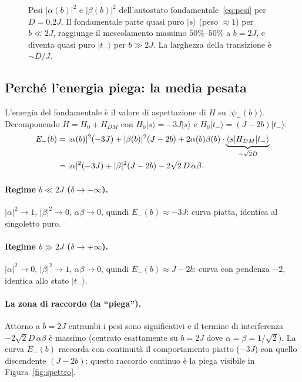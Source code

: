 \documentclass[11pt,a4paper]{article}
\newcommand{\ket}[1]{\lvert #1 \rangle}
\newcommand{\melem}[3]{\langle #1 \vert #2 \vert #3 \rangle}
\theoremstyle{definition}
\begin{document}
\begin{figure}[htbp]
\caption{Pesi $|\alpha(b)|^2$ e $|\beta(b)|^2$ dell'autostato fondamentale~\eqref{eq:pesi}
per $D=0.2J$. Il fondamentale parte quasi puro $\ket{s}$ (peso $\approx1$) per $b\ll2J$,
raggiunge il mescolamento massimo $50\%$--$50\%$ a $b=2J$, e diventa quasi puro $\ket{t_-}$
per $b\gg2J$. La larghezza della transizione è $\sim D/J$.}
\label{fig:mixing}
\end{figure}

\FloatBarrier
\subsection{Perché l'energia piega: la media pesata}

L'energia del fondamentale è il valore di aspettazione di $H$ su $\ket{\psi_-(b)}$.
Decomponendo $H=H_0+H_{DM}$ con $H_0\ket{s}=-3J\ket{s}$ e $H_0\ket{t_-}=(J-2b)\ket{t_-}$:
\begin{align}
E_-(b)
&=|\alpha(b)|^2(-3J)+|\beta(b)|^2(J-2b)
+2\alpha(b)\beta(b)\cdot\underbrace{\melem{s}{H_{DM}}{t_-}}_{-\sqrt2 D}\notag\\
&=|\alpha|^2(-3J)+|\beta|^2(J-2b)-2\sqrt2\,D\,\alpha\beta.
\label{eq:Emedia}
\end{align}

\paragraph{Regime $b\ll2J$ ($\delta\to-\infty$).}
$|\alpha|^2\to1$, $|\beta|^2\to0$, $\alpha\beta\to0$, quindi
$E_-(b)\approx-3J$: curva piatta, identica al singoletto puro.

\paragraph{Regime $b\gg2J$ ($\delta\to+\infty$).}
$|\alpha|^2\to0$, $|\beta|^2\to1$, $\alpha\beta\to0$, quindi
$E_-(b)\approx J-2b$: curva con pendenza $-2$, identica allo stato $\ket{t_-}$.

\paragraph{La zona di raccordo (la ``piega'').}
Attorno a $b=2J$ entrambi i pesi sono significativi e il termine di interferenza
$-2\sqrt2 D\,\alpha\beta$ è massimo (centrato esattamente su $b=2J$ dove $\alpha=\beta=1/\sqrt2$).
La curva $E_-(b)$ raccorda con continuità il comportamento piatto ($-3J$) con quello discendente
$(J-2b)$: questo raccordo continuo è la piega visibile in Figura~\ref{fig:spettro}.
\end{document}
